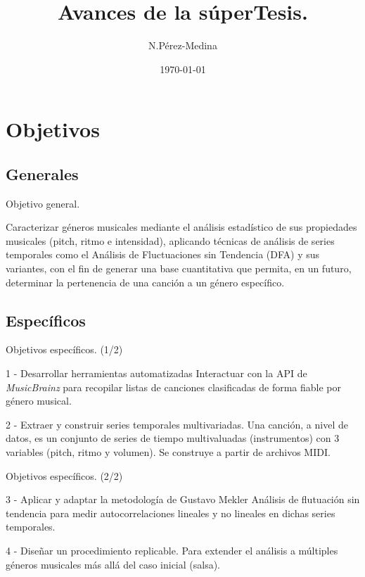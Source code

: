 \documentclass[11pt]{beamer}
\author{N.Pérez-Medina}
\title{\textbf{Avances de la súperTesis.}}
\institute{\textbf{FING - UACH}
	\\
	\begin{small}
	\textit{Reconocimiento de patrones}\\
	\textbf{Catedrático:} Dr. José Luis Herrera Águilar
	\end{small}		
	}
\date{\today}
\begin{document}
\begin{frame}
\titlepage
\end{frame}

\begin{frame}
\tableofcontents
\end{frame}

\section{Objetivos}
\subsection{Generales}
\begin{frame}{Objetivo general.}
	\begin{block}{}
		Caracterizar géneros musicales mediante el análisis estadístico de sus propiedades musicales (pitch, ritmo e intensidad), aplicando técnicas de análisis de series temporales como el Análisis de Fluctuaciones sin Tendencia (DFA) y sus variantes, con el fin de generar una base cuantitativa que permita, en un futuro, determinar la pertenencia de una canción a un género específico.
	\end{block}
\end{frame}
\subsection{Específicos}
\begin{frame}{Objetivos específicos. (1/2)}
	\begin{block}{1 - Desarrollar herramientas automatizadas}
		Interactuar con la API de \textit{MusicBrainz} para recopilar listas de canciones clasificadas de forma fiable por género musical.
	\end{block}
	\begin{block}{2 - Extraer y construir series temporales multivariadas.}
		Una canción, a nivel de datos, es un conjunto de series de tiempo multivaluadas (instrumentos) con 3 variables (pitch, ritmo y volumen). Se construye a partir de archivos MIDI.
	\end{block}
\end{frame}

\begin{frame}{Objetivos específicos. (2/2)}
	\begin{block}{3 - Aplicar y adaptar la metodología de Gustavo Mekler}
		Análisis de flutuación sin tendencia para medir autocorrelaciones lineales y no lineales en dichas series temporales.
	\end{block}
	\begin{block}{4 - Diseñar un procedimiento replicable.}
		Para extender el análisis a múltiples géneros musicales más allá del caso inicial (salsa).
	\end{block}
\end{frame}
\end{document}
